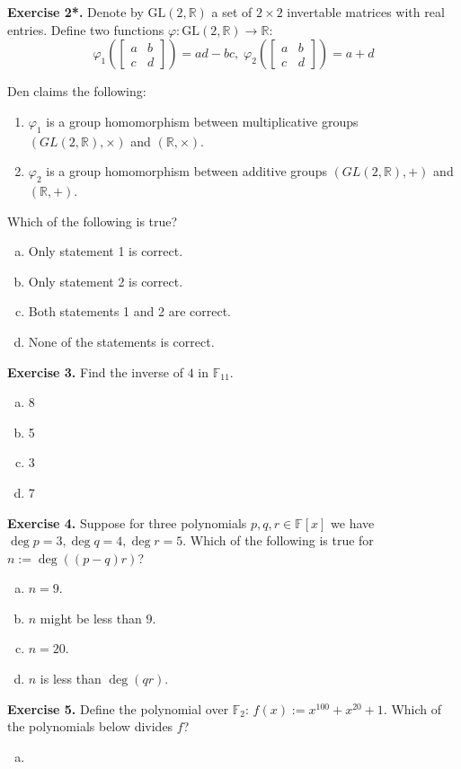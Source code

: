 \documentclass[../lecture-notes.tex]{subfiles}
\begin{document}
\textbf{Exercise 2*.} Denote by $\text{GL}(2,\mathbb{R})$ a set of $2\times 2$ invertable matrices with real entries. Define two functions $\varphi: \text{GL}(2,\mathbb{R}) \to \mathbb{R}$:
\begin{equation}
    \varphi_1 \left(\begin{bmatrix}
        a & b \\ c & d
    \end{bmatrix}\right) = ad - bc, \; \varphi_2 \left(\begin{bmatrix}
        a & b \\ c & d
    \end{bmatrix}\right) = a + d
\end{equation}

Den claims the following:
\begin{enumerate}
    \item $\varphi_1$ is a group homomorphism between multiplicative groups $(GL(2,\mathbb{R}), \times)$ and $(\mathbb{R}, \times)$.
    \item $\varphi_2$ is a group homomorphism between additive groups $(GL(2, \mathbb{R}), +)$ and $(\mathbb{R}, +)$.
\end{enumerate}

Which of the following is true?

\begin{enumerate}[a)]
    \item Only statement 1 is correct.
    \item Only statement 2 is correct.
    \item Both statements 1 and 2 are correct.
    \item None of the statements is correct.
\end{enumerate}

\textbf{Exercise 3.} Find the inverse of $4$ in $\mathbb{F}_{11}$.
\begin{enumerate}[a)]
    \item 8
    \item 5
    \item 3
    \item 7
\end{enumerate}

\textbf{Exercise 4.} Suppose for three polynomials $p,q,r \in \mathbb{F}[x]$ we have $\deg p = 3, \deg q = 4, \deg r = 5$. Which of the following is true for $n := \deg ((p-q)r)$?
\begin{enumerate}[a)]
    \item $n = 9$.
    \item $n$ might be less than $9$.
    \item $n = 20$.
    \item $n$ is less than $\deg (qr)$. 
\end{enumerate}

\textbf{Exercise 5.} Define the polynomial over $\mathbb{F}_2$: $f(x) := x^{100} + x^{20} + 1$. Which of the polynomials below divides $f$?
\begin{enumerate}[a)]
    \item 
\end{enumerate}
\end{document}
